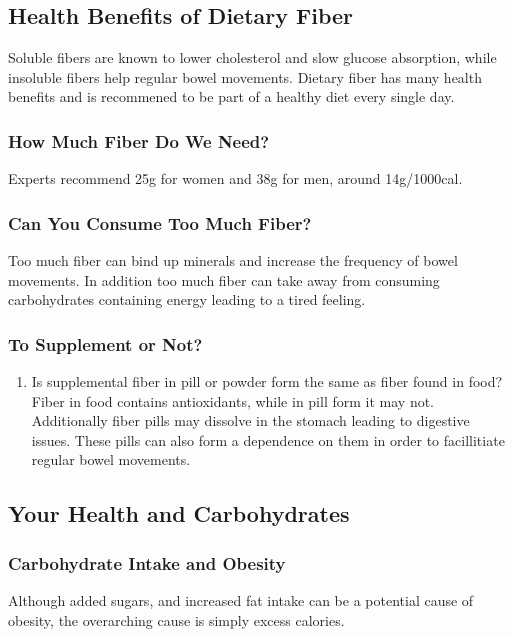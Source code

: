 \documentclass[letterpaper, 11pt]{article}
\begin{document}
\subsection{Health Benefits of Dietary Fiber}
\label{sec:orge0673af}
Soluble fibers are known to lower cholesterol and slow glucose absorption, while insoluble fibers help regular bowel movements. Dietary fiber has many health benefits and is recommened to be part of a healthy diet every single day.\\
\subsubsection{How Much Fiber Do We Need?}
\label{sec:orgc2a9baf}
Experts recommend 25g for women and 38g for men, around 14g/1000cal.\\
\subsubsection{Can You Consume Too Much Fiber?}
\label{sec:org90bb9ee}
Too much fiber can bind up minerals and increase the frequency of bowel movements. In addition too much fiber can take away from consuming carbohydrates containing energy leading to a tired feeling.\\
\subsubsection{To Supplement or Not?}
\label{sec:orga74352b}
\begin{enumerate}
\item Is supplemental fiber in pill or powder form the same as fiber found in food?
\label{sec:org2a81ba4}
Fiber in food contains antioxidants, while in pill form it may not. Additionally fiber pills may dissolve in the stomach leading to digestive issues. These pills can also form a dependence on them in order to facillitiate regular bowel movements.\\
\end{enumerate}
\subsection{Your Health and Carbohydrates}
\label{sec:org5e55fdc}
\subsubsection{Carbohydrate Intake and Obesity}
\label{sec:orgaf94c61}
Although added sugars, and increased fat intake can be a potential cause of obesity, the overarching cause is simply excess calories.\\
\end{document}
